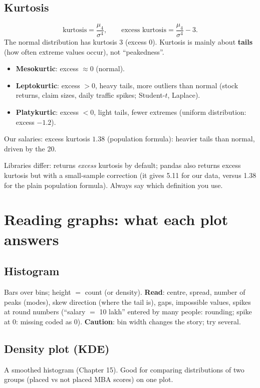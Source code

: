 \subsection{Kurtosis}
\[ \text{kurtosis} = \frac{\mu_4}{\sigma^4},\qquad \text{excess kurtosis} = \frac{\mu_4}{\sigma^4} - 3. \]
The normal distribution has kurtosis 3 (excess 0). Kurtosis is mainly about \textbf{tails} (how often extreme values occur), not ``peakedness''.
\begin{itemize}
\item \textbf{Mesokurtic}: excess $\approx0$ (normal).
\item \textbf{Leptokurtic}: excess $>0$, heavy tails, more outliers than normal (stock returns, claim sizes, daily traffic spikes; Student-$t$, Laplace).
\item \textbf{Platykurtic}: excess $<0$, light tails, fewer extremes (uniform distribution: excess $-1.2$).
\end{itemize}
Our salaries: excess kurtosis $1.38$ (population formula): heavier tails than normal, driven by the 20.

\begin{trap}
Libraries differ:  returns \emph{excess} kurtosis by default; pandas  also returns excess kurtosis but with a
small-sample correction (it gives 5.11 for our data, versus 1.38 for the plain population formula). Always say which definition you use.
\end{trap}

\section{Reading graphs: what each plot answers}
\subsection{Histogram}
Bars over bins; height $=$ count (or density). \textbf{Read}: centre, spread, number of peaks (modes), skew direction (where the tail is), gaps,
impossible values, spikes at round numbers (``salary $=$ 10 lakh'' entered by many people: rounding; spike at 0: missing coded as 0). \textbf{Caution}:
bin width changes the story; try several.

\subsection{Density plot (KDE)}
A smoothed histogram (Chapter 15). Good for comparing distributions of two groups (placed vs not placed MBA scores) on one plot.

